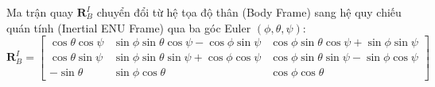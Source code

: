 Ma trận quay $\mathbf{R}_B^I$ chuyển đổi từ hệ tọa độ thân (Body Frame) sang hệ quy chiếu quán tính (Inertial ENU Frame) qua ba góc Euler $(\phi, \theta, \psi)$:
\begin{equation}
\mathbf{R}_B^I = \begin{bmatrix}
\cos\theta\cos\psi & \sin\phi\sin\theta\cos\psi - \cos\phi\sin\psi & \cos\phi\sin\theta\cos\psi + \sin\phi\sin\psi \\
\cos\theta\sin\psi & \sin\phi\sin\theta\sin\psi + \cos\phi\cos\psi & \cos\phi\sin\theta\sin\psi - \sin\phi\cos\psi \\
-\sin\theta & \sin\phi\cos\theta & \cos\phi\cos\theta
\end{bmatrix}
\label{eq:euler-rotation-matrix-3d}
\end{equation}




